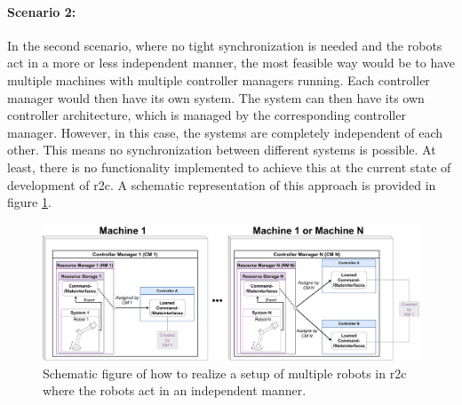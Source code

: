 \paragraph{Scenario 2:} 
In the second scenario, where no tight synchronization is needed and the robots act in a more or less independent manner, the most feasible way would be to have multiple machines with multiple controller managers running. Each controller manager would then have its own system. The system can then have its own controller architecture, which is managed by the corresponding controller manager. \newline
However, in this case, the systems are completely independent of each other. This means no synchronization between different systems is possible. At least, there is no functionality implemented to achieve this at the current state of development of \gls{r2c}. A schematic representation of this approach is provided in figure \ref{c3_fig_r2c_mr_is}.
\begin{figure}[H]
	\centering
	\includegraphics[width=1\textwidth]{Figures/c3/multiple_independent_robots_current.pdf}
	\caption{Schematic figure of how to realize a setup of multiple robots in \gls{r2c} where the robots act in an independent manner.}
	\label{c3_fig_r2c_mr_is}
\end{figure}

